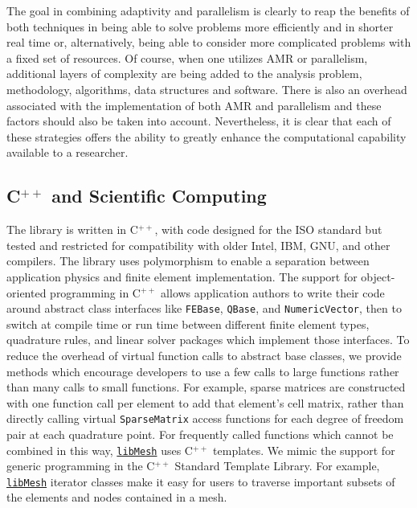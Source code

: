 \documentclass[global,twocolumn,final]{svjour}
\newcommand{\libMesh}{\href{http://libmesh.sourceforge.net}{\texttt{lib\-Mesh}}}
\newcommand{\cpp}{C{\tiny$^{++}$}}
\begin{document}
The goal in combining adaptivity and parallelism is clearly to reap
the benefits of both techniques in being able to solve problems more
efficiently and in shorter real time or, alternatively, being able to
consider more complicated problems with a fixed set of resources.  Of
course, when one utilizes AMR or parallelism, additional layers of
complexity are being added to the analysis problem, methodology,
algorithms, data structures and software.  There is also an overhead
associated with the implementation of both AMR and parallelism and
these factors should also be taken into account.  Nevertheless, it is
clear that each of these strategies offers the ability to greatly
enhance the computational capability available to a researcher.

\subsection{\cpp{} and Scientific Computing}
The library is written in \cpp, with code designed for the ISO
standard but tested and restricted for compatibility with older Intel,
IBM, GNU, and other compilers.  The library uses polymorphism to
enable a separation between application physics and finite element
implementation.  The support for object-oriented programming in \cpp{}
allows application authors to write their code around abstract class
interfaces like \texttt{FEBase}, \texttt{QBase}, and
\texttt{NumericVector}, then to switch at compile time or run time
between different finite element types, quadrature rules, and linear
solver packages which implement those interfaces.  To reduce the
overhead of virtual function calls to abstract base classes, we
provide methods which encourage developers to use a few calls to large
functions rather than many calls to small functions.  For example,
sparse matrices are constructed with one function call per element to
add that element's cell matrix, rather than directly calling virtual
\texttt{SparseMatrix} access functions for each degree of freedom pair
at each
quadrature point.  For frequently called functions which cannot be
combined in this way, \libMesh{} uses \cpp{} templates.  We mimic the
support for generic programming in the \cpp{} Standard Template
Library.  For example, \libMesh{} iterator classes make it easy for
users to traverse important subsets of the elements and nodes
contained in a mesh.
\end{document}
